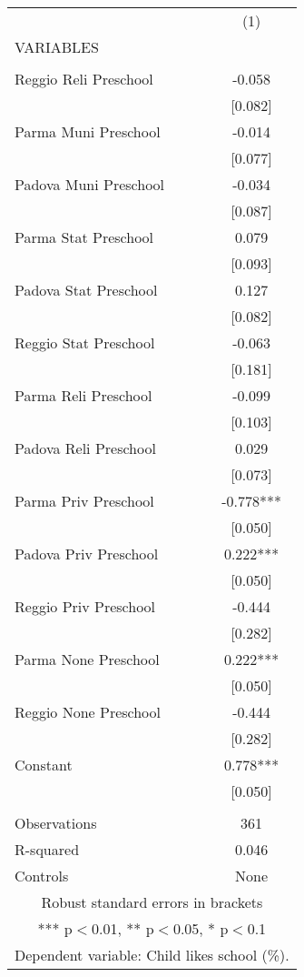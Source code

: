 \begin{tabular}{lc} \hline
 & (1) \\
VARIABLES &  \\ \hline
 &  \\
Reggio Reli Preschool & -0.058 \\
 & [0.082] \\
Parma Muni Preschool & -0.014 \\
 & [0.077] \\
Padova Muni Preschool & -0.034 \\
 & [0.087] \\
Parma Stat Preschool & 0.079 \\
 & [0.093] \\
Padova Stat Preschool & 0.127 \\
 & [0.082] \\
Reggio Stat Preschool & -0.063 \\
 & [0.181] \\
Parma Reli Preschool & -0.099 \\
 & [0.103] \\
Padova Reli Preschool & 0.029 \\
 & [0.073] \\
Parma Priv Preschool & -0.778*** \\
 & [0.050] \\
Padova Priv Preschool & 0.222*** \\
 & [0.050] \\
Reggio Priv Preschool & -0.444 \\
 & [0.282] \\
Parma None Preschool & 0.222*** \\
 & [0.050] \\
Reggio None Preschool & -0.444 \\
 & [0.282] \\
Constant & 0.778*** \\
 & [0.050] \\
 &  \\
Observations & 361 \\
R-squared & 0.046 \\
 Controls & None \\ \hline
\multicolumn{2}{c}{ Robust standard errors in brackets} \\
\multicolumn{2}{c}{ *** p$<$0.01, ** p$<$0.05, * p$<$0.1} \\
\multicolumn{2}{c}{ Dependent variable: Child likes school (\%).} \\
\end{tabular}
